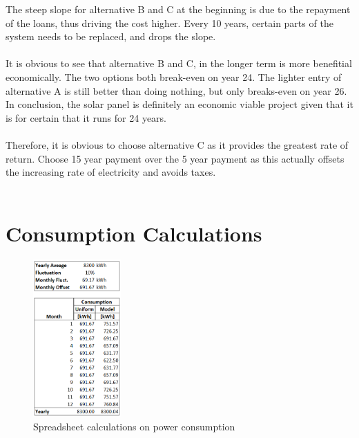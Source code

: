 \documentclass[10pt,letterpaper]{article}
\begin{document}
The steep slope for alternative B and C at the beginning is due to the repayment of the loans, thus driving the cost higher. Every 10 years, certain parts of the system needs to be replaced, and drops the slope.\\
\\
It is obvious to see that alternative B and C, in the longer term is more benefitial economically. The two options both break-even on year 24. The lighter entry of alternative A is still better than doing nothing, but only breaks-even on year 26. In conclusion, the solar panel is definitely an economic viable project given that it is for certain that it runs for 24 years.\\
\\
Therefore, it is obvious to choose alternative C as it provides the greatest rate of return. Choose 15 year payment over the 5 year payment as this actually offsets the increasing rate of electricity and avoids taxes.\\
\\

\clearpage
{}



\clearpage
\appendix
\section{Consumption Calculations}\label{appendix:consumption}
\begin{figure}[H]
	\centering
	\includegraphics[width=0.3\textwidth]{assets/1534568770072}
	\caption{Spreadsheet calculations on power consumption}
\end{figure}

\clearpage
\end{document}
